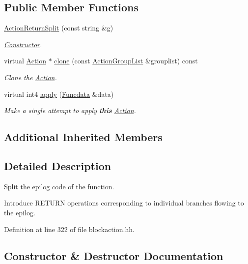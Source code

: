 \subsection*{Public Member Functions}
\begin{DoxyCompactItemize}
\item 
\mbox{\hyperlink{class_action_return_split_a334fd9debddf6bd633666d593b50549b}{Action\+Return\+Split}} (const string \&g)
\begin{DoxyCompactList}\small\item\em \mbox{\hyperlink{class_constructor}{Constructor}}. \end{DoxyCompactList}\item 
virtual \mbox{\hyperlink{class_action}{Action}} $\ast$ \mbox{\hyperlink{class_action_return_split_afa7ea727f756deda567aa1f87bdfe28b}{clone}} (const \mbox{\hyperlink{class_action_group_list}{Action\+Group\+List}} \&grouplist) const
\begin{DoxyCompactList}\small\item\em Clone the \mbox{\hyperlink{class_action}{Action}}. \end{DoxyCompactList}\item 
virtual int4 \mbox{\hyperlink{class_action_return_split_a19c3922a6dc7e8e0af6eed9becd7c01b}{apply}} (\mbox{\hyperlink{class_funcdata}{Funcdata}} \&data)
\begin{DoxyCompactList}\small\item\em Make a single attempt to apply {\bfseries{this}} \mbox{\hyperlink{class_action}{Action}}. \end{DoxyCompactList}\end{DoxyCompactItemize}
\subsection*{Additional Inherited Members}


\subsection{Detailed Description}
Split the epilog code of the function. 

Introduce R\+E\+T\+U\+RN operations corresponding to individual branches flowing to the epilog. 

Definition at line 322 of file blockaction.\+hh.



\subsection{Constructor \& Destructor Documentation}
\mbox{\label{class_action_return_split_a334fd9debddf6bd633666d593b50549b}} 
